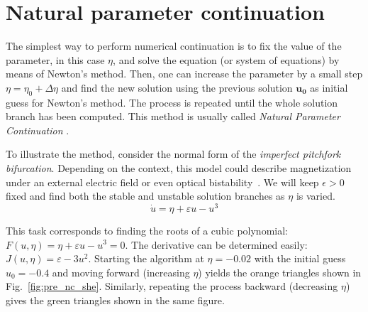 \section{Natural parameter continuation}

The simplest way to perform numerical continuation is to fix the value 
of the parameter, in this case $\eta$, and solve the equation (or system of 
equations) by means of Newton's method. Then, one can increase the parameter 
by a small step $\eta = \eta_0 + \Delta \eta$ and find the new solution using 
the previous solution $\bm{u_0}$ as initial guess for Newton's method. 
The process is repeated until the whole solution branch has been 
computed. This method is usually called {\em Natural Parameter Continuation}
\cite{doedel2007lecture}.

\begin{exmp}
    To illustrate the method, consider the normal form of the {\em imperfect pitchfork
    bifurcation}. Depending on the context, this model could describe magnetization
    under an external electric field or even optical bistability~\cite{strogatz2018nonlinear}. We will 
    keep $\epsilon > 0$ fixed and
    find both the stable and unstable solution branches as $\eta$ is varied.
\begin{equation}
        \dot{u} = \eta + \varepsilon u - u^3
        \label{eq:pre_nc_she}
    \end{equation}

    This task corresponds to finding the roots of a cubic polynomial: $F(u, \eta) = \eta + \varepsilon u - u^3 = 0$. The derivative
    can be determined easily: $J(u, \eta) = \varepsilon - 3u^2$. Starting the algorithm
    at $\eta = -0.02$ with the initial guess $u_0=-0.4$ and moving forward (increasing $\eta$)
    yields the orange triangles shown in Fig.~\ref{fig:pre_nc_she}. Similarly, repeating
    the process backward (decreasing $\eta$) gives the green triangles shown in the same
    figure. 



\end{exmp}

